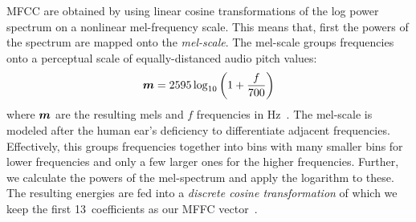 MFCC are obtained by using linear cosine transformations of the log power spectrum on a nonlinear mel-frequency scale. This means that, first the powers of the spectrum are mapped onto the \emph{mel-scale}. The mel-scale groups frequencies onto a perceptual scale of equally-distanced audio pitch values: 
$$
\boldsymbol{m} = 2595 \log_{10}\left(1+{\frac {f}{700}}\right)
$$
where $\boldsymbol{m}$ are the resulting mels and $f$ frequencies in Hz~\cite{stevens1937scale}. The mel-scale is modeled after the human ear's deficiency to differentiate adjacent frequencies. Effectively, this groups frequencies together into bins with many smaller bins for lower frequencies and only a few larger ones for the higher frequencies. Further, we calculate the powers of the mel-spectrum and apply the logarithm to these. The resulting energies are fed into a \emph{discrete cosine transformation} of which we keep the first \num{13}~coefficients as our MFFC vector~\cite{sahidullah2012design}. 
